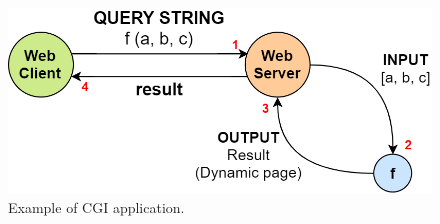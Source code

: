 \begin{figure}[ht]
\centering
\includegraphics[scale=0.4]{Images/HTTP/cgi}
\caption{\footnotesize{Example of CGI application.}}\label{cgi}
\end{figure}